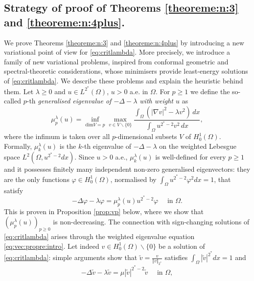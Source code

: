 \documentclass[10pt]{amsart}
\numberwithin{equation}{section}
\newcommand{\vp}{\varphi}
\newcommand{\Om}{\Omega}
\newcommand{\mkl}{\mu_{k}^{\lambda}}
\newcommand{\mpl}{\mu_{p}^{\lambda}}
\theoremstyle{plain}
\theoremstyle{remark}
\begin{document}
\subsection{Strategy of proof of Theorems \ref{theoreme:n:3} and \ref{theoreme:n:4plus}.} \label{strategie_preuve}

We prove Theorems \ref{theoreme:n:3} and \ref{theoreme:n:4plus} by introducing a new variational point of view for \eqref{eq:critlambda}. More precisely, we introduce a family of new variational problems, inspired from conformal geometric and spectral-theoretic considerations, whose minimisers provide least-energy solutions of \eqref{eq:critlambda}. We describe these problems and explain the heuristic behind them. Let $\lambda \ge 0 $ and  $u \in L^{2^*}(\Om)$, $u >0$ a.e. in $\Om$. For $ p \ge 1$ we define the so-called $p$-th \emph{generalised eigenvalue of $-\Delta - \lambda$ with weight $u$} as
\begin{equation*}
\mpl(u) = \inf_{\text{dim} V = p} \max_{v \in V \backslash \{0\}} \frac{\int_{\Om}\left(  |\nabla v|^2 - \lambda v^2 \right) \, dx}{\int_{\Om} u^{2^*-2} v^2 \, dx},
\end{equation*} 
where the infimum is taken over all $p$-dimensional subsets $V$ of $H^1_0(\Om)$. Formally, $\mkl(u)$ is the $k$-th eigenvalue of $-\Delta-\lambda$ on the weighted Lebesgue space $L^2(\Om, u^{2^*-2}dx)$. Since $u>0$ a.e., $\mkl(u)$ is well-defined for every $p \ge 1$ and it possesses finitely many independent non-zero generalised eigenvectors: they are the only functions $\vp \in H^1_0(\Om)$, normalised by $\int_{\Om} u^{2^*-2} \vp^2 dx = 1$, that satisfy
\begin{equation} \label{eq:vec:propre:intro}
 - \Delta \vp - \lambda \vp = \mpl(u) u^{2^*-2} \vp \quad \text{ in } \Om. 
 \end{equation}
This is proven in Proposition \ref{prop:vp} below, where we show that $(\mpl(u))_{p \ge0}$ is non-decreasing.  The connection with sign-changing solutions of \eqref{eq:critlambda} arises through the weighted eigenvalue equation \eqref{eq:vec:propre:intro}. Let indeed $v \in H^1_0(\Om) \backslash \{0\}$ be a solution of \eqref{eq:critlambda}: simple arguments show that $\tilde v = \frac{v}{\Vert v \Vert_{2^*}}$ satisfies $\int_\Om |\tilde v|^{2^*}dx = 1$ and 
\begin{equation} \label{eq:vec:propre:intro:2}
 - \Delta \tilde v - \lambda \tilde v = \mu |\tilde v|^{2^*-2} \tilde v \quad \text{ in } \Om, 
 \end{equation}
\end{document}
